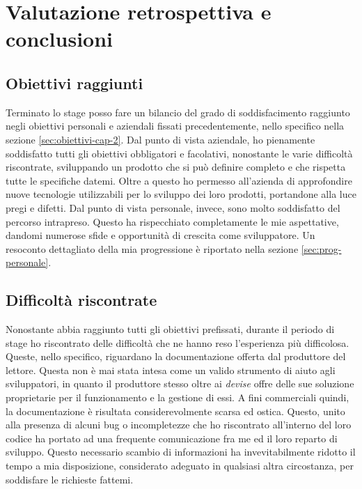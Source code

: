 
\chapter{Valutazione retrospettiva e conclusioni}
\label{cap:conclusioni}


\section{Obiettivi raggiunti}
Terminato lo stage posso fare un bilancio del grado di soddisfacimento raggiunto negli obiettivi 
personali e aziendali fissati precedentemente, nello specifico nella sezione \ref{sec:obiettivi-cap-2}.
Dal punto di vista aziendale, ho pienamente soddisfatto tutti gli obiettivi obbligatori e facolativi, nonostante le varie difficoltà riscontrate,
sviluppando un prodotto che si può definire completo e che rispetta tutte le specifiche datemi. Oltre a questo ho permesso all'azienda
di approfondire nuove tecnologie utilizzabili per lo sviluppo dei loro prodotti, portandone alla luce pregi e difetti.
Dal punto di vista personale, invece, sono molto soddisfatto del percorso intrapreso. Questo ha rispecchiato completamente le mie
aspettative, dandomi numerose sfide e opportunità di crescita come sviluppatore. Un resoconto  dettagliato della mia progressione
è riportato nella sezione \ref{sec:prog-personale}.

\section{Difficoltà riscontrate}
Nonostante abbia raggiunto tutti gli obiettivi prefissati, durante il periodo di stage ho riscontrato delle difficoltà che ne hanno reso
l'esperienza più difficolosa. Queste, nello specifico, riguardano la documentazione offerta dal produttore del lettore. 
Questa non è mai stata intesa come un valido strumento di aiuto agli sviluppatori,
in quanto il produttore stesso oltre ai \emph{devise} offre delle sue soluzione proprietarie per il funzionamento e la gestione di essi.
A fini commerciali quindi, la documentazione è risultata considerevolmente scarsa ed ostica.
Questo, unito alla presenza di alcuni bug o incompletezze che ho riscontrato all'interno del loro codice ha portato ad una frequente comunicazione fra me ed il loro reparto di sviluppo.
Questo necessario scambio di informazioni ha invevitabilmente ridotto il tempo a mia disposizione, considerato adeguato in qualsiasi altra circostanza, per soddisfare le richieste fattemi.

